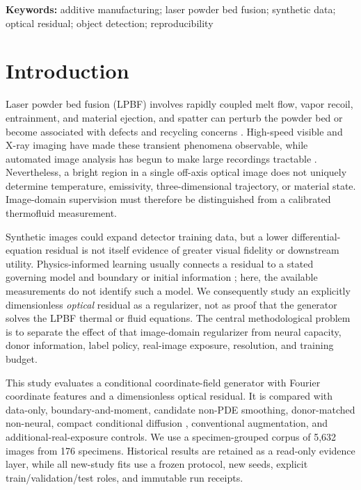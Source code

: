 \documentclass[11pt]{article}
\title{\papertitle}
\author{Hyojin Park$^{1}$, Nam-Hyun Yoo$^{2}$, and Jinhong Yang$^{3,*}$\\[0.5em]
\footnotesize $^{1}$Gyeongnam Intelligence Innovation Center, Kyungnam University, Changwon 51767, Republic of Korea\\
\footnotesize $^{2}$Department of Computer Engineering, Kyungnam University, Changwon 51767, Republic of Korea\\
\footnotesize $^{3}$Department of Medical Information Technology, Inje University, Gimhae 50834, Republic of Korea\\
\footnotesize $^*$Correspondence: jinhong@inje.ac.kr}
\date{}
\begin{document}
\maketitle

\begin{abstract}

\end{abstract}

\noindent\textbf{Keywords:} additive manufacturing; laser powder bed fusion; synthetic data; optical residual; object detection; reproducibility

\section{Introduction}
Laser powder bed fusion (LPBF) involves rapidly coupled melt flow, vapor recoil, entrainment, and material ejection, and spatter can perturb the powder bed or become associated with defects and recycling concerns \citep{khairallah2016,zhao2017,guo2018}. High-speed visible and X-ray imaging have made these transient phenomena observable, while automated image analysis has begun to make large recordings tractable \citep{kivirasi2020,ikeshoji2022,gobert2025}. Nevertheless, a bright region in a single off-axis optical image does not uniquely determine temperature, emissivity, three-dimensional trajectory, or material state. Image-domain supervision must therefore be distinguished from a calibrated thermofluid measurement.

Synthetic images could expand detector training data, but a lower differential-equation residual is not itself evidence of greater visual fidelity or downstream utility. Physics-informed learning usually connects a residual to a stated governing model and boundary or initial information \citep{raissi2019}; here, the available measurements do not identify such a model. We consequently study an explicitly dimensionless \emph{optical} residual as a regularizer, not as proof that the generator solves the LPBF thermal or fluid equations. The central methodological problem is to separate the effect of that image-domain regularizer from neural capacity, donor information, label policy, real-image exposure, resolution, and training budget.

This study evaluates a conditional coordinate-field generator with Fourier coordinate features \citep{tancik2020} and a dimensionless optical residual. It is compared with data-only, boundary-and-moment, candidate non-PDE smoothing, donor-matched non-neural, compact conditional diffusion \citep{ho2020,song2021}, conventional augmentation, and additional-real-exposure controls. We use a specimen-grouped corpus of 5,632 images from 176 specimens. Historical results are retained as a read-only evidence layer, while all new-study fits use a frozen protocol, new seeds, explicit train/validation/test roles, and immutable run receipts.
\end{document}

